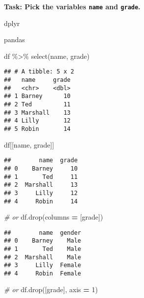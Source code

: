 \documentclass[
]{book}
\newenvironment{Shaded}{\begin{snugshade}}{\end{snugshade}}
\newcommand{\CommentTok}[1]{\textcolor[rgb]{0.56,0.35,0.01}{\textit{#1}}}
\newcommand{\DecValTok}[1]{\textcolor[rgb]{0.00,0.00,0.81}{#1}}
\newcommand{\FunctionTok}[1]{\textcolor[rgb]{0.00,0.00,0.00}{#1}}
\newcommand{\NormalTok}[1]{#1}
\newcommand{\OperatorTok}[1]{\textcolor[rgb]{0.81,0.36,0.00}{\textbf{#1}}}
\newcommand{\SpecialCharTok}[1]{\textcolor[rgb]{0.00,0.00,0.00}{#1}}
\newcommand{\StringTok}[1]{\textcolor[rgb]{0.31,0.60,0.02}{#1}}
\begin{document}
{\textbf{Task: Pick the variables \texttt{name} and \texttt{grade}.
}}

dplyr

pandas

\begin{Shaded}
\begin{Highlighting}[]
\NormalTok{df }\SpecialCharTok{\%\textgreater{}\%} 
  \FunctionTok{select}\NormalTok{(name, grade)}
\end{Highlighting}
\end{Shaded}

\begin{verbatim}
## # A tibble: 5 x 2
##   name     grade
##   <chr>    <dbl>
## 1 Barney      10
## 2 Ted         11
## 3 Marshall    13
## 4 Lilly       12
## 5 Robin       14
\end{verbatim}

\begin{Shaded}
\begin{Highlighting}[]
\NormalTok{df[[}\StringTok{\textquotesingle{}name\textquotesingle{}}\NormalTok{, }\StringTok{\textquotesingle{}grade\textquotesingle{}}\NormalTok{]]}
\end{Highlighting}
\end{Shaded}

\begin{verbatim}
##        name  grade
## 0    Barney     10
## 1       Ted     11
## 2  Marshall     13
## 3     Lilly     12
## 4     Robin     14
\end{verbatim}

\begin{Shaded}
\begin{Highlighting}[]
\CommentTok{\# or}
\NormalTok{df.drop(columns }\OperatorTok{=}\NormalTok{ [}\StringTok{\textquotesingle{}grade\textquotesingle{}}\NormalTok{])}
\end{Highlighting}
\end{Shaded}

\begin{verbatim}
##        name  gender
## 0    Barney    Male
## 1       Ted    Male
## 2  Marshall    Male
## 3     Lilly  Female
## 4     Robin  Female
\end{verbatim}

\begin{Shaded}
\begin{Highlighting}[]
\CommentTok{\# or}
\NormalTok{df.drop([}\StringTok{\textquotesingle{}grade\textquotesingle{}}\NormalTok{], axis }\OperatorTok{=} \DecValTok{1}\NormalTok{)}
\end{Highlighting}
\end{Shaded}
\end{document}
